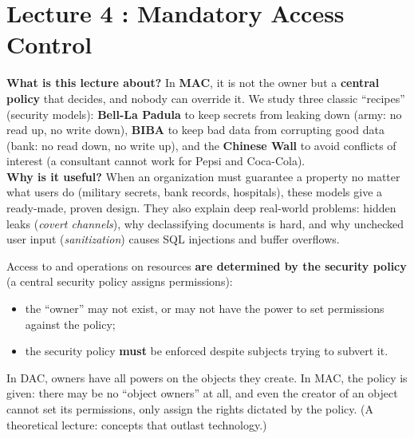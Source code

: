 \chapter{Lecture 4 : Mandatory Access Control}

\begin{rembox}[title=In a nutshell]
\textbf{What is this lecture about?} In \textbf{MAC}, it is not the owner but a
\textbf{central policy} that decides, and nobody can override it. We study three classic
``recipes'' (security models): \textbf{Bell-La Padula} to keep secrets from leaking down
(army: no read up, no write down), \textbf{BIBA} to keep bad data from corrupting good
data (bank: no read down, no write up), and the \textbf{Chinese Wall} to avoid conflicts
of interest (a consultant cannot work for Pepsi and Coca-Cola). \\
\textbf{Why is it useful?} When an organization must guarantee a property no matter what
users do (military secrets, bank records, hospitals), these models give a ready-made,
proven design. They also explain deep real-world problems: hidden leaks (\emph{covert
channels}), why declassifying documents is hard, and why unchecked user input
(\emph{sanitization}) causes SQL injections and buffer overflows.
\end{rembox}

\begin{defnbox}[title=Mandatory Access Control (MAC)]
Access to and operations on resources \textbf{are determined by the security policy}
(a central security policy assigns permissions):
\begin{itemize}
  \item the ``owner'' may not exist, or may not have the power to set permissions
        against the policy;
  \item the security policy \textbf{must} be enforced despite subjects trying to
        subvert it.
\end{itemize}
\end{defnbox}

\begin{rembox}[title=Reminder: DAC vs.\ MAC]
In DAC, owners have all powers on the objects they create. In MAC, the policy is given: there may
be no ``object owners'' at all, and even the creator of an object cannot set its permissions,
only assign the rights dictated by the policy. (A theoretical lecture: concepts that outlast
technology.)
\end{rembox}

